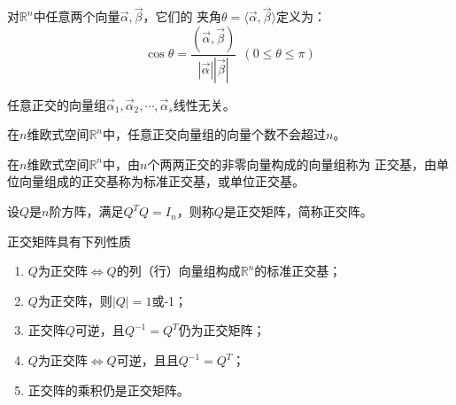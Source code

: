 \begin{Def}
对$\mathbb{R}^n$中任意两个向量$\vec{\alpha},\vec{\beta}$，它们的
夹角$\theta=\langle\vec{\alpha},\vec{\beta}\rangle$定义为：
\begin{equation*}
\cos\theta=\frac{(\vec{\alpha},\vec{\beta})}{|\vec\alpha||\vec\beta|}~~
(0\leq\theta\leq\pi)
\end{equation*}
\end{Def}

\begin{thm}
任意正交的向量组$\vec{\alpha}_1,\vec{\alpha}_2,\cdots,\vec{\alpha}_s$线性无关。
\end{thm}

\begin{cor}
在$n$维欧式空间$\mathbb{R}^n$中，任意正交向量组的向量个数不会超过$n$。
\end{cor}

\begin{Def}
在$n$维欧式空间$\mathbb{R}^n$中，由$n$个两两正交的非零向量构成的向量组称为
正交基，由单位向量组成的正交基称为标准正交基，或单位正交基。
\end{Def}

\begin{Def}
设$Q$是$n$阶方阵，满足$Q^TQ=I_n$，则称$Q$是正交矩阵，简称正交阵。
\end{Def}

\begin{thm}
正交矩阵具有下列性质
\begin{enumerate}
  \item $Q$为正交阵$\Leftrightarrow$$Q$的列（行）向量组构成$\mathbb{R}^n$的标准正交基；
  \item $Q$为正交阵，则$|Q|=1$或-1；
  \item 正交阵$Q$可逆，且$Q^{-1}=Q^{T}$仍为正交矩阵；
  \item $Q$为正交阵$\Leftrightarrow$$Q$可逆，且且$Q^{-1}=Q^{T}$；
  \item 正交阵的乘积仍是正交矩阵。
\end{enumerate}
\end{thm}

